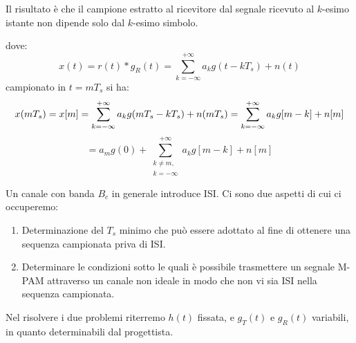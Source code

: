 Il risultato è che il campione estratto al ricevitore dal segnale ricevuto al $k$-esimo istante non dipende solo dal $k$-esimo simbolo.

\begin{center}
\end{center}

dove:
\[
    x(t) = r(t) \ast g_R(t) = \sum_{k=-\infty}^{+\infty} a_k g(t - kT_s) + n(t)
\]
campionato in $t = mT_s$ si ha:
\[
    x(mT_s) = x[m] = \sum_{k=-\infty}^{+\infty} a_k g(mT_s - kT_s) + n(mT_s) = \sum_{k=-\infty}^{+\infty} a_k g[m-k] + n[m] \\
\]
\[
    = a_m g(0) + \sum_{\substack{k \neq m,\\ k=-\infty}}^{+\infty} a_k g[m-k] + n[m]
\]



Un canale con banda \( B_c \) in generale introduce ISI. Ci sono due aspetti di cui ci occuperemo:

\begin{enumerate}
    \item Determinazione del \( T_s \) minimo che può essere adottato al fine di ottenere una sequenza campionata priva di ISI.
    \item Determinare le condizioni sotto le quali è possibile trasmettere un segnale M-PAM attraverso un canale non ideale in modo che non vi sia ISI nella sequenza campionata.
\end{enumerate}

Nel risolvere i due problemi riterremo \( h(t) \) fissata, e \( g_T(t) \) e \( g_R(t) \) variabili, in quanto determinabili dal progettista.

